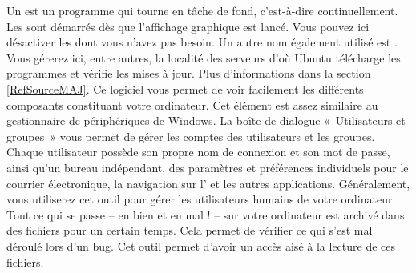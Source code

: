 Un  est un programme qui tourne en tâche de fond, c'est-à-dire continuellement. Les  sont démarrés dès que l'affichage graphique est lancé. Vous pouvez ici désactiver les  dont vous n'avez pas besoin. Un autre nom également utilisé est .
Vous gérerez ici, entre autres, la localité des serveurs d'où Ubuntu télécharge les programmes et vérifie les mises à jour. Plus d'informations dans la section \ref{RefSourceMAJ}.
Ce logiciel vous permet de voir facilement les différents composants constituant votre ordinateur. Cet élément est assez similaire au gestionnaire de périphériques de Windows.
La boîte de dialogue «~Utilisateurs et groupes~» vous permet de gérer les comptes des utilisateurs et les groupes. Chaque utilisateur possède son propre nom de connexion et son mot de passe, ainsi qu'un bureau indépendant, des paramètres et préférences individuels pour le courrier électronique, la navigation sur l' et les autres applications. Généralement, vous utiliserez cet outil pour gérer les utilisateurs humains de votre ordinateur.
Tout ce qui se passe -- en bien et en mal ! -- sur votre ordinateur est archivé dans des fichiers  pour un certain temps. Cela permet de vérifier ce qui s'est mal déroulé lors d'un bug. Cet outil permet d'avoir un accès aisé à la lecture de ces fichiers.
